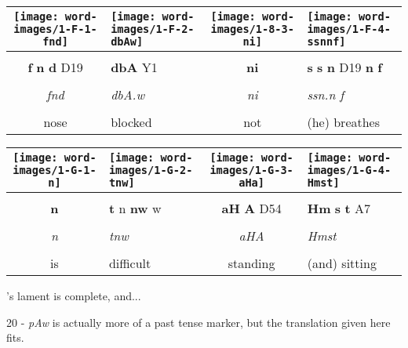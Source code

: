 \vspace{7.5mm}

\begin{tabularx}{\linewidth}{cYcY}
	\texttt{[image: word-images/1-F-1-fnd]} &
	\texttt{[image: word-images/1-F-2-dbAw]} &
	\texttt{[image: word-images/1-8-3-ni]} &
	\texttt{[image: word-images/1-F-4-ssnnf]} \\
	\hline \\ 
	\textbf{f} \textbf{n} \textbf{d} D19 &
	\textbf{dbA} Y1 &
	\textbf{ni} &
	\textbf{s} \textbf{s} \textbf{n} D19 \textbf{n} \textbf{f} \\
	\hline \\ 
	\textit{fnd} & \textit{dbA.w} & \textit{ni} & \textit{ssn.n f} \\
	\hline \\ 
	nose & blocked & not & (he) breathes
\end{tabularx}

\vspace{7.5mm}

\begin{tabularx}{\linewidth}{cYcY}
	\texttt{[image: word-images/1-G-1-n]} &
	\hspace*{-2mm}\texttt{[image: word-images/1-G-2-tnw]} &
	\hspace*{-2mm}\texttt{[image: word-images/1-G-3-aHa]} &
	\hspace*{-2mm}\texttt{[image: word-images/1-G-4-Hmst]} \\
	\hline \\ 
	\textbf{n} &
	\textbf{t} n \textbf{nw} w &
	\textbf{aH} \textbf{A} D54 &
	\textbf{Hm} \textbf{s} \textbf{t} A7 \\
	\hline \\ 
	\textit{n} & \textit{tnw} & \textit{aHA} & \textit{Hmst} \\
	\hline \\ 
	is & difficult & standing & (and) sitting
\end{tabularx}

\vspace*{\fill}

\pagebreak

\vspace*{\fill}

's lament is complete, and...

\vspace*{\fill}

20 - \textit{pAw} is actually more of a past tense marker, but the translation given here fits.

